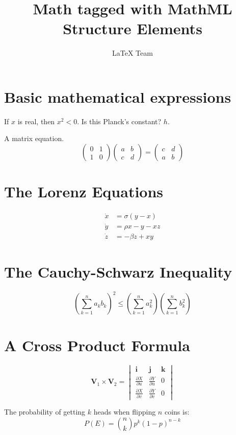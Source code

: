 \documentclass{article}
\title{Math tagged with MathML Structure Elements}
\author{LaTeX Team}
\begin{document}
\maketitle

\section{Basic mathematical expressions}

If $x$ is real, then $x^{2} < 0$. Is this Planck's constant? $h$.

A matrix equation.
\[
\begin{pmatrix}0&1\\1&0\end{pmatrix}
\begin{pmatrix}a&b\\c&d\end{pmatrix}
=
\begin{pmatrix}c&d\\a&b\end{pmatrix}
\]

\section{The Lorenz Equations}
\[\begin{aligned}
\dot{x} & = \sigma(y-x) \\
\dot{y} & = \rho x - y - xz \\
\dot{z} & = -\beta z + xy
\end{aligned} \]

\section{The Cauchy-Schwarz Inequality}
\[ \left( \sum_{k=1}^n a_k b_k \right)^2 \leq \left( \sum_{k=1}^n a_k^2 \right) \left( \sum_{k=1}^n b_k^2 \right) \]
\section{A Cross Product Formula}
\[\mathbf{V}_1 \times \mathbf{V}_2 =  \begin{vmatrix}
\mathbf{i} & \mathbf{j} & \mathbf{k} \\
\frac{\partial X}{\partial u} &  \frac{\partial Y}{\partial u} & 0 \\
\frac{\partial X}{\partial v} &  \frac{\partial Y}{\partial v} & 0
\end{vmatrix}  \]

The probability of getting $k$ heads when flipping $n$ coins is: 
\[P(E) = {n \choose k} p^k (1-p)^{ n-k} \]
\end{document}

